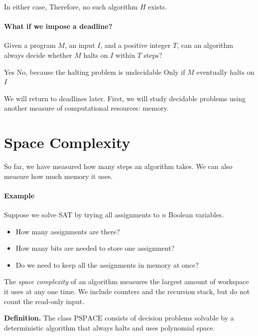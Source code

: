 \documentclass[11  pt]{article}
\begin{document}
In either case,  Therefore, no such algorithm $H$ exists.

\paragraph{What if we impose a deadline?}
\begin{Qu}
    Given a program $M$, an input $I$, and a positive integer $T$, can an algorithm always decide whether $M$ halts on $I$ within $T$ steps?
    \begin{itemize}
        \aitem Yes
        \bitem No, because the halting problem is undecidable
        \citem Only if $M$ eventually halts on $I$
    \end{itemize}
\end{Qu}

\vfill
We will return to deadlines later. First, we will study decidable problems using another measure of computational resources: memory.


\newpage
\section{Space Complexity}
So far, we have measured how many steps an algorithm takes. We can also measure how much memory it uses.

\paragraph{Example}
Suppose we solve SAT by trying all assignments to $n$ Boolean variables.
\begin{itemize}
    \item How many assignments are there? 
    \item How many bits are needed to store one assignment? 
    \item Do we need to keep all the assignments in memory at once?
\end{itemize}
\vs{1cm}

The \emph{space complexity} of an algorithm measures the largest amount of workspace it uses at any one time. We include counters and the recursion stack, but do not count the read-only input.

\textbf{Definition.} The class $\mathrm{PSPACE}$ consists of decision problems solvable by a deterministic algorithm that always halts and uses polynomial space.
\end{document}
